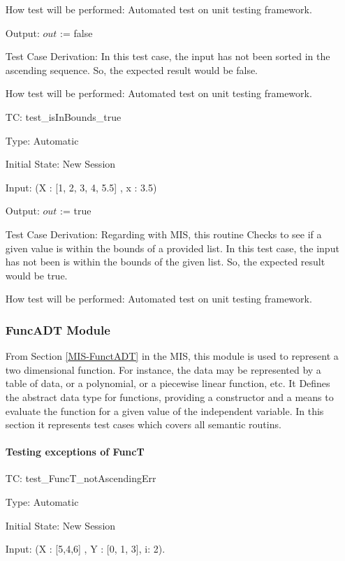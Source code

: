\documentclass[12pt]{article}
\newcounter{utestnum} %
\begin{document}
\begin{enumerate}[label=TC\arabic*:,ref={\arabic*}]
	How test will be performed: Automated test on unit testing framework.


Output: $out$ := false

Test Case Derivation: In this test case, the input has not been sorted in the ascending sequence. So, the expected result would be false.

How test will be performed: Automated test on unit testing framework.

\item [TC\refstepcounter{utestnum}\theutestnum: \label{isInBoundsTest}] 
test\_isInBounds\_true

Type: Automatic

Initial State: New Session

Input: (X : [1, 2, 3, 4, 5.5] , x : 3.5)

Output: $out$ := true

Test Case Derivation: Regarding with MIS, this routine Checks to see if a given value is within the bounds of a provided list. In this test case, the input has not been is within the bounds of the given list. So, the expected result would be true.

How test will be performed: Automated test on unit testing framework.


\subsubsection{FuncADT Module}	
From Section \ref{MIS-FunctADT} in the MIS, this module is used to represent a two dimensional
function.  For instance, the data may be represented by a table of data, or a
polynomial, or a piecewise linear function, etc.
It Defines the abstract data type for functions, providing a
constructor and a means to evaluate the function for a given value of the
independent variable. In this section it represents test cases which covers all semantic routins.

\paragraph{Testing exceptions of FuncT} 

\item [TC\refstepcounter{utestnum}\theutestnum: \label{FuncTnotAscendingErrTest}] 
test\_FuncT\_notAscendingErr

Type: Automatic

Initial State: New Session

Input: (X : [5,4,6] , Y : [0, 1, 3], i: 2).


\end{enumerate}
\end{document}
